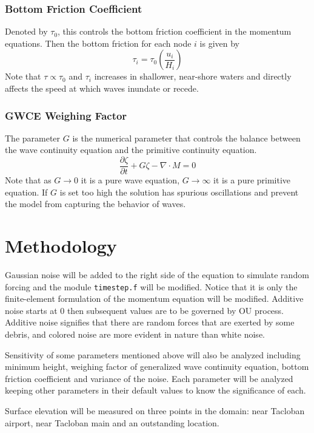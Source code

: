 \documentclass[a4paper, 10pt]{article}
\begin{document}
	\subsubsection{Bottom Friction Coefficient}
	Denoted by $\tau_0$, this controls the bottom friction coefficient in the momentum equations. Then the bottom friction for each node $i$ is given by
	\begin{equation*}
	\tau_i = \tau_0 \left(\frac{u_i}{H_i}\right)
	\end{equation*}
	Note that $\tau \propto \tau_0$ and $\tau_i$ increases in shallower, near-shore waters and directly affects the speed at which waves inundate or recede.
	
	\subsubsection{GWCE Weighing Factor}
	The parameter $G$ is the numerical parameter that controls the balance between the wave continuity equation and the primitive continuity equation.
	\begin{equation*}
	\frac{\partial \zeta}{\partial t} + G\zeta - \nabla \cdot M = 0
	\end{equation*}
	Note that as $G \rightarrow 0$ it is a pure wave equation, $G \rightarrow \infty$ it is a pure primitive equation. If $G$ is set too high the solution has spurious oscillations and prevent the model from capturing the behavior of waves.
	
	\section{Methodology}
	Gaussian noise will be added to the right side of the equation to simulate random forcing and the module \texttt{timestep.f} will be modified. Notice that it is only the finite-element formulation of the momentum equation will be modified. Additive noise starts at $0$ then subsequent values are to be governed by OU process. Additive noise signifies that there are random forces that are exerted by some debris, and colored noise are more evident in nature than white noise.
	
	Sensitivity of some parameters mentioned above will also be analyzed including minimum height, weighing factor of generalized wave continuity equation, bottom friction coefficient and variance of the noise. Each parameter will be analyzed keeping other parameters in their default values to know the significance of each.
	
	Surface elevation will be measured on three points in the domain: near Tacloban airport, near Tacloban main and an outstanding location.
	
\end{document}
